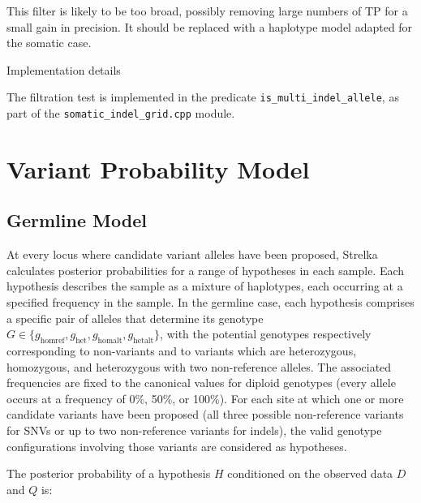 \documentclass{article}
\newenvironment{raggedParagraph}[1]
{
    \begin{paragraph} {#1}
        \raggedright
    }
    {
    \end{paragraph}
}
\begin{document}
This filter is likely to be too broad, possibly removing large numbers of TP for a small gain in precision. It should be replaced with a haplotype model adapted for the somatic case.

\begin{raggedParagraph}{Implementation details}

The filtration test is implemented in the predicate \verb|is_multi_indel_allele|, as part of the \verb|somatic_indel_grid.cpp| module.

\end{raggedParagraph}

\fi %


\section{Variant Probability Model}
\subsection{Germline Model}
\label{sec:germline}
At every locus where candidate variant alleles have been proposed, Strelka calculates posterior probabilities for a range of hypotheses in each sample. Each hypothesis describes the sample as a mixture of haplotypes, each occurring at a specified frequency in the sample. In the germline case, each hypothesis comprises a specific pair of alleles that determine its genotype $G \in \{ g_\mathrm{homref}, g_\mathrm{het}, g_\mathrm{homalt}, g_\mathrm{hetalt} \}$, with the potential genotypes respectively corresponding to non-variants and to variants which are heterozygous, homozygous, and heterozygous with two non-reference alleles. The associated frequencies are fixed to the canonical values for diploid genotypes (every allele occurs at a frequency of 0\%, 50\%, or 100\%). For each site at which one or more candidate variants have been proposed (all three possible non-reference variants for SNVs or up to two non-reference variants for indels), the valid genotype configurations involving those variants are considered as hypotheses.

The posterior probability of a hypothesis $H$ conditioned on the observed data $D$ and $Q$ is:
\end{document}
